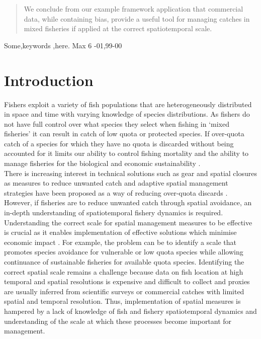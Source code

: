 \documentclass[review]{elsarticle}
\begin{document}
\begin{frontmatter}
\begin{abstract}
We conclude from our example framework application that commercial data, while
containing bias, provide a useful tool for managing catches in mixed fisheries
if applied at the correct spatiotemporal scale. \\
\end{abstract}

\begin{keyword}
Some\sep keywords \sep here. Max 6 
-01\sep  99-00
\end{keyword}

\end{frontmatter}

\linenumbers

\section{Introduction}

Fishers exploit a variety of fish populations that are heterogeneously
distributed in space and time with varying knowledge of species distributions.
As fishers do not have full control over what species they select when fishing
in `mixed fisheries' it can result in catch of low quota or protected species.
If over-quota catch of a species for which they have no quota is discarded
without being accounted for it limits our ability to control fishing mortality
\citep{Alverson1994, Crowder1998, Rijnsdorp2007} and the ability to manage
fisheries for the biological and economic sustainability \citep{Ulrich2011a,
	Batsleer2015}.\\

There is increasing interest in technical solutions such as gear and spatial
closures as measures to reduce unwanted catch \citep{Kennelly2002,
	Catchpole2008, Bellido2011, Cosgrove2019} and adaptive spatial
management strategies have been proposed as a way of reducing over-quota
discards \citep{Holmes2011, Little2014, Dunn2014a}. However, if fisheries are
to reduce unwanted catch through spatial avoidance, an in-depth understanding
of spatiotemporal fishery dynamics is required. \\

Understanding the correct scale for spatial management measures to be effective
is crucial as it enables implementation of effective solutions which minimise
economic impact \citep{Dunn2016}. For example, the problem can be to identify a
scale that promotes species avoidance for vulnerable or low quota species while
allowing continuance of sustainable fisheries for available quota species.
Identifying the correct spatial scale remains a challenge because data on fish
location at high temporal and spatial resolutions is expensive and difficult to
collect and proxies are usually inferred from scientific surveys or commercial
catches with limited spatial and temporal resolution. Thus, implementation of
spatial measures is hampered by a lack of knowledge of fish and fishery
spatiotemporal dynamics and understanding of the scale at which these processes
become important for management. \\ \\ 
\end{document}
